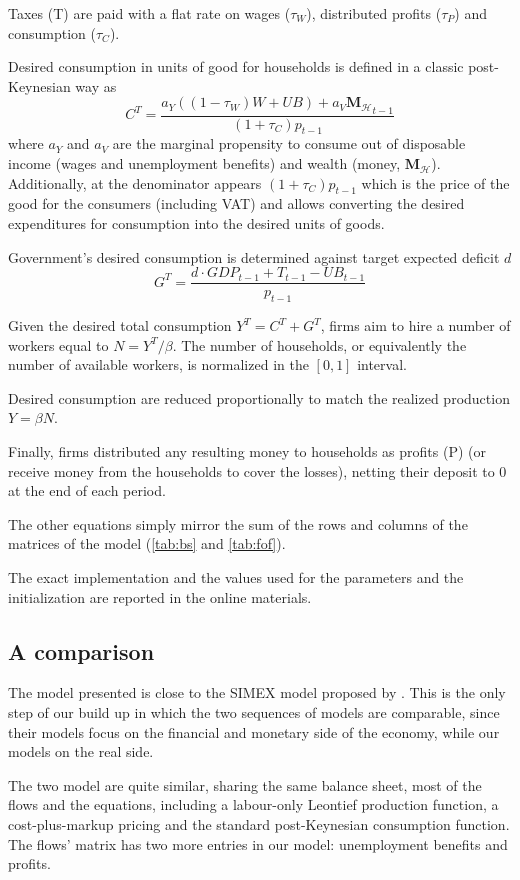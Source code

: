 Taxes (T) are paid with a flat rate on wages ($\tau_W$), distributed profits ($\tau_P$) and consumption ($\tau_C$).

Desired consumption in units of good for households is defined in a classic post-Keynesian way as $$C^T = \frac{a_Y ((1 - \tau_W) W + UB) + a_V {\mathbf{M}_\mathcal{H}}_{t-1}}{(1 + \tau_C) p_{t-1}}$$
where $a_Y$ and $a_V$ are the marginal propensity to consume out of disposable income (wages and unemployment benefits) and wealth (money, $\mathbf{M}_\mathcal{H}$).
Additionally, at the denominator appears $(1 + \tau_C) p_{t-1}$ which is the price of the good for the consumers (including VAT) and allows converting the desired expenditures for consumption into the desired units of goods.

Government's desired consumption is determined against target expected deficit $d$ $$G^T = \frac{d \cdot {GDP}_{t-1} + T_{t-1} - UB_{t-1}}{p_{t-1}}$$

Given the desired total consumption $Y^T = C^T + G^T$, firms aim to hire a number of workers equal to $N = Y^T/\beta$.
The number of households, or equivalently the number of available workers, is normalized in the $[0,1]$ interval.

Desired consumption are reduced proportionally to match the realized production $Y = \beta N$.

Finally, firms distributed any resulting money to households as profits (P) (or receive money from the households to cover the losses), netting their deposit to 0 at the end of each period.

The other equations simply mirror the sum of the rows and columns of the matrices of the model (\ref{tab:bs} and \ref{tab:fof}).

The exact implementation and the values used for the parameters and the initialization are reported in the online materials.

\subsection{A comparison}
The model presented is close to the SIMEX model proposed by \textcite{godley2012}. This is the only step of our build up in which the two sequences of models are comparable, since their models focus on the financial and monetary side of the economy, while our models on the real side.

The two model are quite similar, sharing the same balance sheet, most of the flows and the equations, including a labour-only Leontief production function, a cost-plus-markup pricing and the standard post-Keynesian consumption function.
The flows' matrix has two more entries in our model: unemployment benefits and profits.

